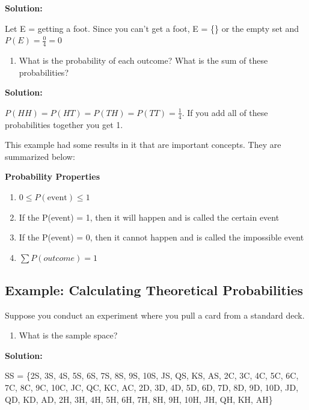 \documentclass[
]{book}
\providecommand{\tightlist}{%
  \setlength{\itemsep}{0pt}\setlength{\parskip}{0pt}}
\begin{document}
\textbf{Solution:}

Let E = getting a foot. Since you can't get a foot, E = \{\} or the empty set and \(P(E)=\frac{0}{4}=0\)

\begin{enumerate}
\def\labelenumi{\alph{enumi}.}
\setcounter{enumi}{6}
\tightlist
\item
  What is the probability of each outcome? What is the sum of these probabilities?
\end{enumerate}

\textbf{Solution:}

\(P(HH)=P(HT)=P(TH)=P(TT)=\frac{1}{4}\). If you add all of these probabilities together you get 1.

This example had some results in it that are important concepts. They are summarized below:

\textbf{Probability Properties}

\begin{enumerate}
\def\labelenumi{\arabic{enumi}.}
\tightlist
\item
  \(0 \le P(\text{event}) \le 1\)
\item
  If the P(event) = 1, then it will happen and is called the certain event
\item
  If the P(event) = 0, then it cannot happen and is called the impossible event
\item
  \(\sum{P(outcome)}=1\)
\end{enumerate}

\hypertarget{example-calculating-theoretical-probabilities-1}{%
\subsection{Example: Calculating Theoretical Probabilities}\label{example-calculating-theoretical-probabilities-1}}

Suppose you conduct an experiment where you pull a card from a standard deck.

\begin{enumerate}
\def\labelenumi{\alph{enumi}.}
\tightlist
\item
  What is the sample space?
\end{enumerate}

\textbf{Solution:}

SS = \{2S, 3S, 4S, 5S, 6S, 7S, 8S, 9S, 10S, JS, QS, KS, AS, 2C, 3C, 4C, 5C, 6C, 7C, 8C, 9C, 10C, JC, QC, KC, AC, 2D, 3D, 4D, 5D, 6D, 7D, 8D, 9D, 10D, JD, QD, KD, AD, 2H, 3H, 4H, 5H, 6H, 7H, 8H, 9H, 10H, JH, QH, KH, AH\}
\end{document}
